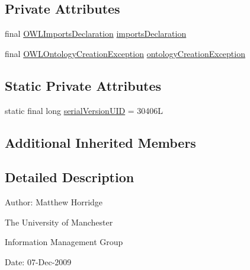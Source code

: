 \subsection*{Private Attributes}
\begin{DoxyCompactItemize}
\item 
final \hyperlink{interfaceorg_1_1semanticweb_1_1owlapi_1_1model_1_1_o_w_l_imports_declaration}{O\-W\-L\-Imports\-Declaration} \hyperlink{classorg_1_1semanticweb_1_1owlapi_1_1model_1_1_unloadable_import_exception_a0e35676e25f463503f90e1be0bf483af}{imports\-Declaration}
\item 
final \hyperlink{classorg_1_1semanticweb_1_1owlapi_1_1model_1_1_o_w_l_ontology_creation_exception}{O\-W\-L\-Ontology\-Creation\-Exception} \hyperlink{classorg_1_1semanticweb_1_1owlapi_1_1model_1_1_unloadable_import_exception_a8208f44c4f442df61b4688fe8c27da0e}{ontology\-Creation\-Exception}
\end{DoxyCompactItemize}
\subsection*{Static Private Attributes}
\begin{DoxyCompactItemize}
\item 
static final long \hyperlink{classorg_1_1semanticweb_1_1owlapi_1_1model_1_1_unloadable_import_exception_a1e7a0bb374332656edfe940b14299c96}{serial\-Version\-U\-I\-D} = 30406\-L
\end{DoxyCompactItemize}
\subsection*{Additional Inherited Members}


\subsection{Detailed Description}
Author\-: Matthew Horridge\par
 The University of Manchester\par
 Information Management Group\par
 Date\-: 07-\/\-Dec-\/2009 

